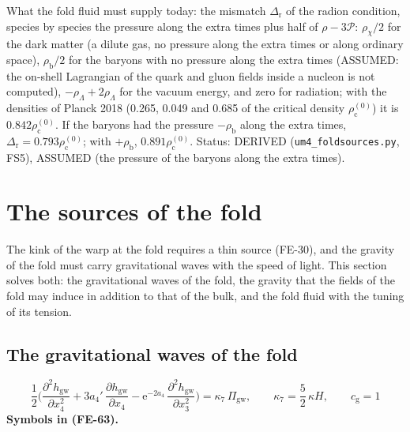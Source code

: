 \documentclass[
  10pt,
]{article}
\begin{document}
What the fold fluid must supply today: the mismatch
\(\Delta_{\mathrm{r}}\) of the radion condition, species by species the
pressure along the extra times plus half of \(\rho - 3\mathcal{P}\):
\(\rho_\chi/2\) for the dark matter (a dilute gas, no pressure along the
extra times or along ordinary space), \(\rho_{\mathrm{b}}/2\) for the
baryons with no pressure along the extra times (ASSUMED: the on-shell
Lagrangian of the quark and gluon fields inside a nucleon is not
computed), \(-\rho_\Lambda + 2\rho_\Lambda\) for the vacuum energy, and
zero for radiation; with the densities of Planck 2018 (0.265, 0.049 and
0.685 of the critical density \(\rho_{\mathrm{c}}^{(0)}\)) it is
\(0.842\rho_{\mathrm{c}}^{(0)}\). If the baryons had the pressure
\(-\rho_{\mathrm{b}}\) along the extra times,
\(\Delta_{\mathrm{r}} = 0.793\rho_{\mathrm{c}}^{(0)}\); with
\(+\rho_{\mathrm{b}}\), \(0.891\rho_{\mathrm{c}}^{(0)}\). Status:
DERIVED (\texttt{um4\_foldsources.py}, FS5), ASSUMED (the pressure of
the baryons along the extra times).

\hypertarget{the-sources-of-the-fold}{%
\section{The sources of the fold}\label{the-sources-of-the-fold}}

The kink of the warp at the fold requires a thin source (FE-30), and the
gravity of the fold must carry gravitational waves with the speed of
light. This section solves both: the gravitational waves of the fold,
the gravity that the fields of the fold may induce in addition to that
of the bulk, and the fold fluid with the tuning of its tension.

\hypertarget{the-gravitational-waves-of-the-fold}{%
\subsection{The gravitational waves of the
fold}\label{the-gravitational-waves-of-the-fold}}

\[
\frac{1}{2}\Big(\frac{\partial^2h_{\mathrm{gw}}}{\partial x_4^2} + 3a_4'\,\frac{\partial h_{\mathrm{gw}}}{\partial x_4}
 - \mathrm{e}^{-2a_4}\,\frac{\partial^2h_{\mathrm{gw}}}{\partial x_3^2}\Big) = \kappa_7\,\Pi_{\mathrm{gw}},\qquad
\kappa_7 = \frac52\,\kappa H,\qquad c_{\mathrm{g}} = 1 \tag{FE-63}
\] \textbf{Symbols in (FE-63).}
\end{document}
